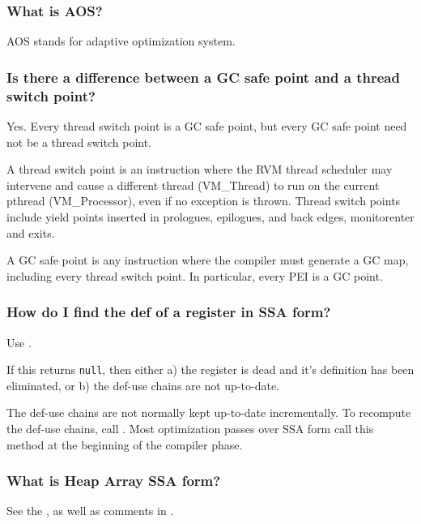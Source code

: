 \subsubsection{What is AOS?}
AOS stands for adaptive optimization system.

\subsubsection{Is there a difference between a GC safe point and a thread
switch point?}

Yes.  Every thread switch point is a GC safe point, but every GC safe point 
need not be a thread switch point.

A thread switch point is an instruction where the RVM thread scheduler may
intervene and cause a different \JavaTM{} thread (VM\_Thread) to
run on the current 
pthread (VM\_Processor), even if no exception is thrown.  
Thread switch points include yield points inserted in prologues, epilogues, 
and back edges, monitorenter and exits.

A GC safe point is any instruction where the compiler must generate a GC map, 
including every thread switch point.  In particular, every 
PEI is a GC point.

\subsubsection{How do I find the def of a register in SSA form?}

Use 
.

If this returns {\tt null}, then either a) the register is dead and it's definition has been eliminated, 
or b) the def-use chains are not up-to-date.

The def-use chains are not normally kept up-to-date incrementally.  To
recompute the def-use chains, call 
. 
Most optimization passes over SSA form call this method at 
the beginning of the compiler phase.

\subsubsection{What is Heap Array SSA form?}
See the , as well as comments in
.

